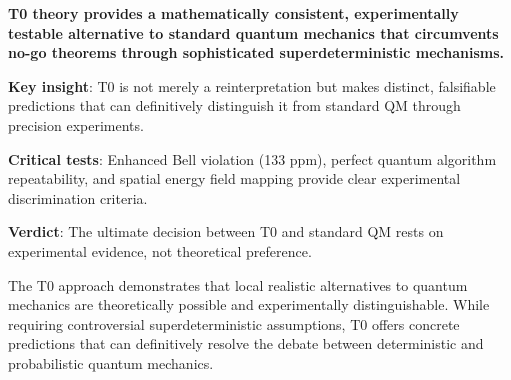 \documentclass[12pt,a4paper]{article}
\begin{document}
	\begin{tcolorbox}[colback=green!5!white,colframe=green!75!black,title=Final Assessment]
		\textbf{T0 theory provides a mathematically consistent, experimentally testable alternative to standard quantum mechanics that circumvents no-go theorems through sophisticated superdeterministic mechanisms.} 
		
		\textbf{Key insight}: T0 is not merely a reinterpretation but makes distinct, falsifiable predictions that can definitively distinguish it from standard QM through precision experiments.
		
		\textbf{Critical tests}: Enhanced Bell violation (133 ppm), perfect quantum algorithm repeatability, and spatial energy field mapping provide clear experimental discrimination criteria.
		
		\textbf{Verdict}: The ultimate decision between T0 and standard QM rests on experimental evidence, not theoretical preference.
	\end{tcolorbox}
	
	The T0 approach demonstrates that local realistic alternatives to quantum mechanics are theoretically possible and experimentally distinguishable. While requiring controversial superdeterministic assumptions, T0 offers concrete predictions that can definitively resolve the debate between deterministic and probabilistic quantum mechanics.
	
\end{document}
